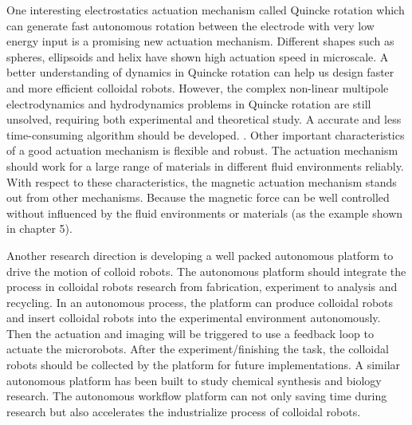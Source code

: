 One interesting electrostatics actuation mechanism called Quincke rotation which can generate fast autonomous rotation between the electrode with very low energy input is a promising new actuation mechanism. \autocite{das2013electrohydrodynamic} Different shapes such as spheres, ellipsoids and helix have shown high actuation speed in microscale.\autocite{brosseau2019relating,das2019active} A better understanding of dynamics in Quincke rotation can help us design faster and more efficient colloidal robots. However, the complex non-linear multipole electrodynamics and hydrodynamics problems in Quincke rotation are still unsolved, requiring  both experimental and theoretical study. A accurate  and  less time-consuming algorithm should be developed. \autocite{fiore2019fast}. Other important characteristics of a good actuation mechanism  is flexible and robust. The actuation mechanism should work for a large range of materials in different fluid environments reliably. With respect to these characteristics,  the magnetic actuation mechanism stands out from other mechanisms. Because the magnetic force can be well controlled without influenced by the fluid environments or materials (as the example shown in chapter 5).

Another research direction is developing a well packed autonomous platform to drive the motion of colloid  robots.  The autonomous platform should integrate the process in colloidal robots research from fabrication, experiment to analysis and recycling. In an autonomous process, the platform can produce colloidal robots and insert colloidal robots into the experimental environment autonomously. Then the actuation and imaging will be triggered to  use a feedback loop to actuate the microrobots. After the experiment/finishing the task, the colloidal robots should be collected by the platform for future implementations. A similar autonomous platform has been built to study chemical synthesis and biology research. \autocite{grizou2020curious,chao2019systems} The autonomous workflow platform can not only saving time during research but also accelerates the industrialize process of colloidal robots.   

